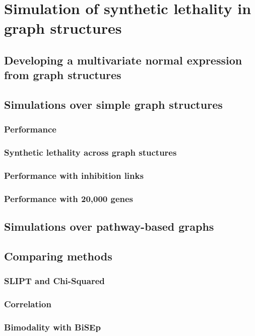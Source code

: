 \section{Simulation of synthetic lethality in graph structures}

\subsection{Developing a multivariate normal expression from graph structures}

\subsection{Simulations over simple graph structures}
\subsubsection{Performance}
\subsubsection{Synthetic lethality across graph stuctures}
\subsubsection{Performance with inhibition links}
\subsubsection{Performance with 20,000 genes}

\subsection{Simulations over pathway-based graphs}

\subsection{Comparing methods}
\subsubsection{SLIPT and Chi-Squared}
\subsubsection{Correlation}
\subsubsection{Bimodality with BiSEp}
